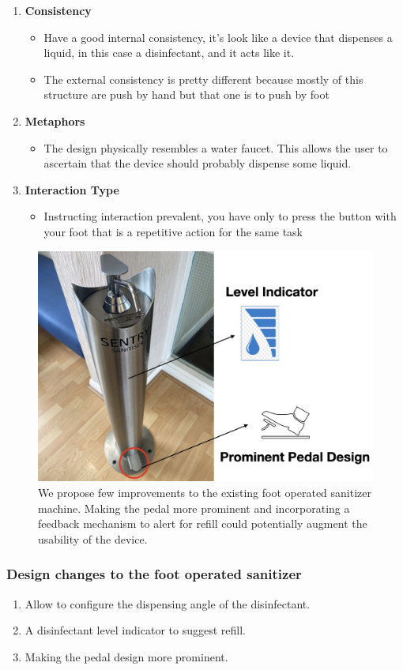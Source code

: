 \documentclass[10pt]{scrartcl}
\begin{document}
\begin{enumerate}
	\item \textbf{Consistency} 
	\begin{itemize}
\item Have a good internal consistency, it’s look like a device that dispenses a liquid, in this case a  disinfectant, and it acts like it.
\item The external consistency is pretty different because mostly of this structure are push by hand but that one is to push by foot

	\end{itemize}
	
	\item \textbf{Metaphors} 	
	\begin{itemize}
		\item The design physically resembles a water faucet. This allows the user to ascertain that the device should probably dispense some liquid.
	\end{itemize}
	
	\item \textbf{Interaction Type}
	\begin{itemize}
		\item Instructing interaction prevalent, you have only to press the button with your foot that is a repetitive action for the same task
	\end{itemize}
\end{enumerate}
\begin{figure}
	\centering
	\includegraphics[width=0.3\linewidth]{san2}
	\caption{We propose few improvements to the existing foot operated sanitizer machine. Making the pedal more prominent and incorporating a feedback mechanism to alert for refill could potentially augment the usability of the device.}
	\label{fig:san2}
\end{figure}


\subsubsection{Design changes to the foot operated sanitizer}
\begin{enumerate}
	\item Allow to configure the dispensing angle of the disinfectant.
	\item A disinfectant level indicator to suggest refill.
	\item Making the pedal design more prominent.
\end{enumerate}
\end{document}
